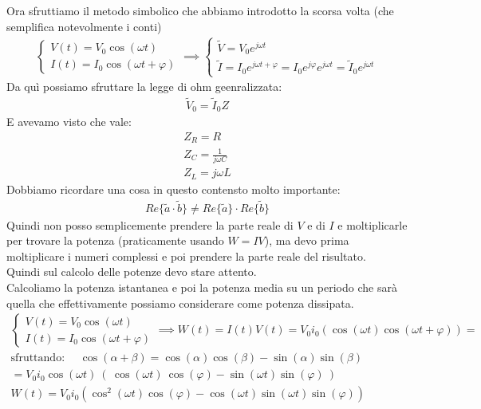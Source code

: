 \documentclass[a4paper, oneside]{article}
\begin{document}
Ora sfruttiamo il metodo simbolico che abbiamo introdotto la scorsa volta (che semplifica notevolmente i conti)
\begin{gather*}
\begin{cases}
        V(t) = V_0 \cos(\omega t)\\
        I(t) = I_0 \cos(\omega t + \varphi)
\end{cases} \implies 
\begin{cases}
        \widetilde{V} = V_0 e^{j \omega t}\\
        \widetilde{I} = I_0 e^{j \omega t + \varphi} = I_0 e^{j \varphi} e^{j \omega t} = \widetilde{I}_0 e^{j \omega t}
\end{cases}
\end{gather*}
Da quì possiamo sfruttare la legge di ohm geenralizzata:
\begin{gather*}
    \widetilde{V}_0 = \widetilde{I}_0 Z
\end{gather*}
E avevamo visto che vale:
\begin{gather*}
    Z_R = R\\
    Z_C = \frac{1}{j \omega C}\\
    Z_L = j \omega L
\end{gather*}
Dobbiamo ricordare una cosa in questo contensto molto importante:
\begin{gather*}
    Re \{ \widetilde{a} \cdot \widetilde{b} \}  \neq Re\{\widetilde{a}\} \cdot Re\{\widetilde{b}\}
\end{gather*}
Quindi non posso semplicemente prendere la parte reale di $V$ e di $I$ e moltiplicarle per trovare la potenza (praticamente usando $W = I V$), ma devo prima moltiplicare i numeri complessi e poi prendere la parte reale del risultato.\\
Quindi sul calcolo delle potenze devo stare attento.\\
Calcoliamo la potenza istantanea e poi la potenza media su un periodo che sarà quella che effettivamente possiamo considerare come potenza dissipata.
\begin{gather*}
    \begin{cases}
        V(t) = V_0 \cos(\omega t)\\
        I(t) = I_0 \cos(\omega t + \varphi)
    \end{cases}
    \implies W(t) = I(t) V(t) = V_0 i_0 (\cos(\omega t) \cos(\omega t + \varphi)) = \\
    \boxed{\text{sfruttando: } \quad \cos(\alpha + \beta) = \cos(\alpha) \cos(\beta) - \sin(\alpha) \sin(\beta)}\\
    = V_0 i_0 \cos(\omega t) \ \left( \ \cos(\omega t) \ \cos(\varphi) - \sin(\omega t) \sin(\varphi) \ \right)\\
    W(t) = V_0 i_0 \left( \cos^2(\omega t) \cos(\varphi) - \cos(\omega t)\sin(\omega t) \sin(\varphi) \right)
\end{gather*}
\end{document}
